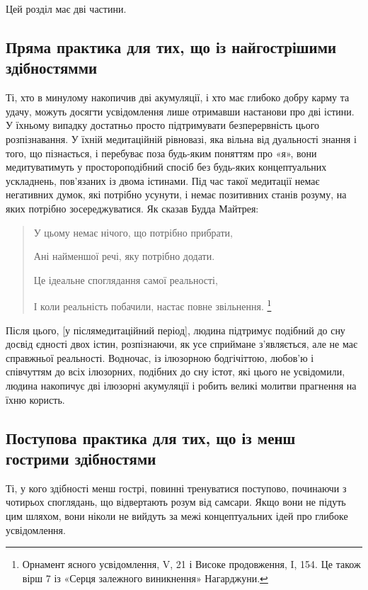 \documentclass{article}
\begin{document}
Цей розділ має дві частини.

\subsection{Пряма практика для тих, що із найгострішими здібностямми}

Ті, хто в минулому накопичив дві акумуляції, і хто має глибоко добру карму та удачу, можуть досягти усвідомлення лише отримавши настанови про дві істини. У їхньому випадку достатньо просто підтримувати безперервність цього розпізнавання. У їхній медитаційній рівновазі, яка вільна від дуальності знання і того, що пізнається, і перебуває поза будь-яким поняттям про «я», вони медитуватимуть у простороподібний спосіб без будь-яких концептуальних ускладнень, пов’язаних із двома істинами. Під час такої медитації немає негативних думок, які потрібно усунути, і немає позитивних станів розуму, на яких потрібно зосереджуватися. Як сказав Будда Майтрея:

\begin{verse}
\item        У цьому немає нічого, що потрібно прибрати, \\
\item        Ані найменшої речі, яку потрібно додати. \\
\item        Це ідеальне споглядання самої реальності, \\
\item        І коли реальність побачили, настає повне звільнення. \footnote{Орнамент ясного усвідомлення, V, 21 і Високе продовження, I, 154. Це також вірш 7 із «Серця залежного виникнення» Нагарджуни.}
\end{verse}

Після цього, [у післямедитаційний період], людина підтримує подібний до сну
досвід єдності двох істин, розпізнаючи, як усе сприймане з’являється,
але не має справжньої реальності. Водночас, із ілюзорною бодгічіттою,
любов’ю і співчуттям до всіх ілюзорних, подібних до сну істот,
які цього не усвідомили, людина накопичує дві ілюзорні акумуляції
і робить великі молитви прагнення на їхню користь.

\subsection{Поступова практика для тих, що із менш гострими здібностями}

Ті, у кого здібності менш гострі, повинні тренуватися поступово, починаючи з чотирьох споглядань, що відвертають розум від самсари. Якщо вони не підуть цим шляхом, вони ніколи не вийдуть за межі концептуальних ідей про глибоке усвідомлення.
\end{document}
